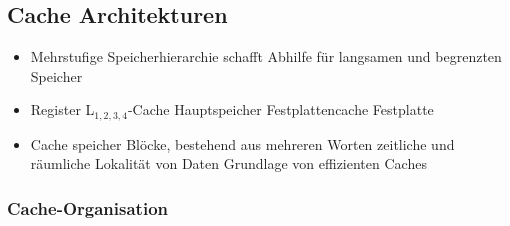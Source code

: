 \subsection{Cache Architekturen}
\begin{itemize}
	\item
		Mehrstufige Speicherhierarchie schafft Abhilfe für langsamen und begrenzten Speicher
	\item
		Register \ra{} L$_{1,2,3,4}$-Cache \ra{} Hauptspeicher \ra{} Festplattencache \ra{} Festplatte
	\item
		Cache speicher Blöcke, bestehend aus mehreren Worten \ra{} zeitliche und räumliche Lokalität von Daten Grundlage von effizienten Caches
\end{itemize}
\subsubsection{Cache-Organisation}
